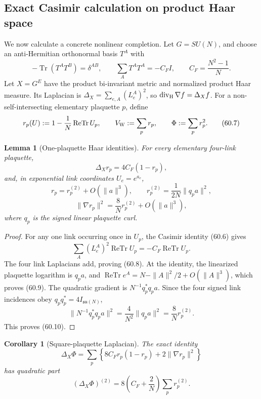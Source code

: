 \documentclass[11pt,oneside]{book}
\newtheorem{lemma}[theorem]{Lemma}
\newtheorem{corollary}[theorem]{Corollary}
\theoremstyle{definition}
\theoremstyle{remark}
\begin{document}
\subsection{Exact Casimir calculation on product Haar space}

We now calculate a concrete nonlinear completion.  Let
\(G=SU(N)\), and choose an anti-Hermitian orthonormal basis
\(T^A\) with
\[
 -\operatorname{Tr}(T^AT^B)=\delta^{AB},\qquad
 \sum_AT^AT^A=-C_FI,\qquad C_F=\frac{N^2-1}{N}.             \tag{60.6}
\]
Let \(X=G^E\) have the product bi-invariant metric and normalized
product Haar measure.  Its Laplacian is
\(\Delta_X=\sum_{e,A}(L_e^A)^2\), so
\(\operatorname{div}_{\rm H}\nabla f=\Delta_Xf\).
For a non-self-intersecting elementary plaquette \(p\), define
\[
 r_p(U):=1-\frac1N\operatorname{ReTr}U_p,\qquad
 V_{\rm W}:=\sum_pr_p,\qquad
 \Phi:=\sum_pr_p^2.                                         \tag{60.7}
\]

\begin{lemma}[One-plaquette Haar identities]
\label{lem:e8v60-plaquette-Haar}
For every elementary four-link plaquette,
\[
 \boxed{\Delta_Xr_p=4C_F(1-r_p),}                            \tag{60.8}
\]
and, in exponential link coordinates \(U_e=e^{a_e}\),
\[
 r_p=r_p^{(2)}+O(\|a\|^3),\qquad
 r_p^{(2)}=\frac1{2N}\|q_pa\|^2,                            \tag{60.9}
\]
\[
 \|\nabla r_p\|^2
 =\frac8N r_p^{(2)}+O(\|a\|^3),                             \tag{60.10}
\]
where \(q_p\) is the signed linear plaquette curl.
\end{lemma}

\begin{proof}
For any one link occurring once in \(U_p\), the Casimir identity
(60.6) gives
\[
 \sum_A(L_e^A)^2\operatorname{ReTr}U_p
 =-C_F\operatorname{ReTr}U_p.
\]
The four link Laplacians add, proving (60.8).  At the identity,
the linearized plaquette logarithm is \(q_pa\), and
\(\operatorname{ReTr}e^A=N-\|A\|^2/2+O(\|A\|^3)\), which proves
(60.9).  The quadratic gradient is
\(N^{-1}q_p^*q_pa\).  Since the four signed link incidences obey
\(q_pq_p^*=4I_{\mathfrak{su}(N)}\),
\[
 \|N^{-1}q_p^*q_pa\|^2
 =\frac4{N^2}\|q_pa\|^2
 =\frac8N r_p^{(2)}.
\]
This proves (60.10).
\end{proof}

\begin{corollary}[Square-plaquette Laplacian]
\label{cor:e8v60-square-Laplacian}
The exact identity
\[
 \Delta_X\Phi
 =\sum_p\left\{8C_Fr_p(1-r_p)
                    +2\|\nabla r_p\|^2\right\}              \tag{60.11}
\]
has quadratic part
\[
 (\Delta_X\Phi)^{(2)}
 =8\left(C_F+\frac2N\right)\sum_pr_p^{(2)}.                 \tag{60.12}
\]
\end{corollary}
\end{document}
